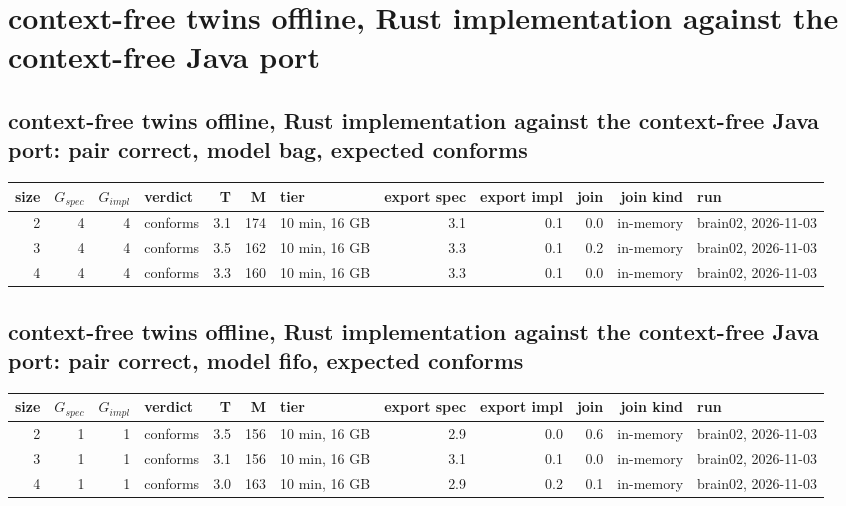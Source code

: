 \documentclass[10pt]{article}
\begin{document}
\section*{context-free twins offline, Rust implementation against the context-free Java port}
\subsection*{context-free twins offline, Rust implementation against the context-free Java port: pair \textsf{correct}, model bag, expected conforms}
\begin{longtable}{@{}rrrlrrlrrrrl@{}}
\toprule
size & $G_{\mathit{spec}}$ & $G_{\mathit{impl}}$ & verdict & T & M & tier & export spec & export impl & join & join kind & run \\
\midrule
\endhead
\color{red} 2 & 4 & 4 & conforms & 3.1 & 174 & 10 min, 16 GB & 3.1 & 0.1 & 0.0 & in-memory & brain02, 2026-11-03 \\
\color{red} 3 & 4 & 4 & conforms & 3.5 & 162 & 10 min, 16 GB & 3.3 & 0.1 & 0.2 & in-memory & brain02, 2026-11-03 \\
\color{red} 4 & 4 & 4 & conforms & 3.3 & 160 & 10 min, 16 GB & 3.3 & 0.1 & 0.0 & in-memory & brain02, 2026-11-03 \\
\bottomrule
\end{longtable}
\subsection*{context-free twins offline, Rust implementation against the context-free Java port: pair \textsf{correct}, model fifo, expected conforms}
\begin{longtable}{@{}rrrlrrlrrrrl@{}}
\toprule
size & $G_{\mathit{spec}}$ & $G_{\mathit{impl}}$ & verdict & T & M & tier & export spec & export impl & join & join kind & run \\
\midrule
\endhead
\color{red} 2 & 1 & 1 & conforms & 3.5 & 156 & 10 min, 16 GB & 2.9 & 0.0 & 0.6 & in-memory & brain02, 2026-11-03 \\
\color{red} 3 & 1 & 1 & conforms & 3.1 & 156 & 10 min, 16 GB & 3.1 & 0.1 & 0.0 & in-memory & brain02, 2026-11-03 \\
\color{red} 4 & 1 & 1 & conforms & 3.0 & 163 & 10 min, 16 GB & 2.9 & 0.2 & 0.1 & in-memory & brain02, 2026-11-03 \\
\bottomrule
\end{longtable}
\end{document}
